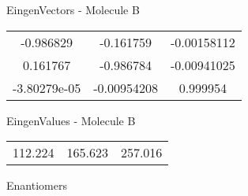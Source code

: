 \begin{multicols}{2}
\begin{center}
\vtab
 EingenVectors - Molecule B     \\
\vtab
\begin{tabular}{|c c c|}
-0.986829	 & 	-0.161759	 & 	-0.00158112	 \\
0.161767	 & 	-0.986784	 & 	-0.00941025	 \\
-3.80279e-05	 & 	-0.00954208	 & 	0.999954
\end{tabular}

\vtab
 EingenValues - Molecule B     \\
\vtab
\begin{tabular}{|c c c|}
112.224	 & 	165.623	 & 	257.016	 \\
\end{tabular}

\end{center}
\end{multicols}
\begin{center}
\vtab
\vtab
\textcolor{NavyBlue}{\Large Enantiomers}
\end{center}

 \newpage

